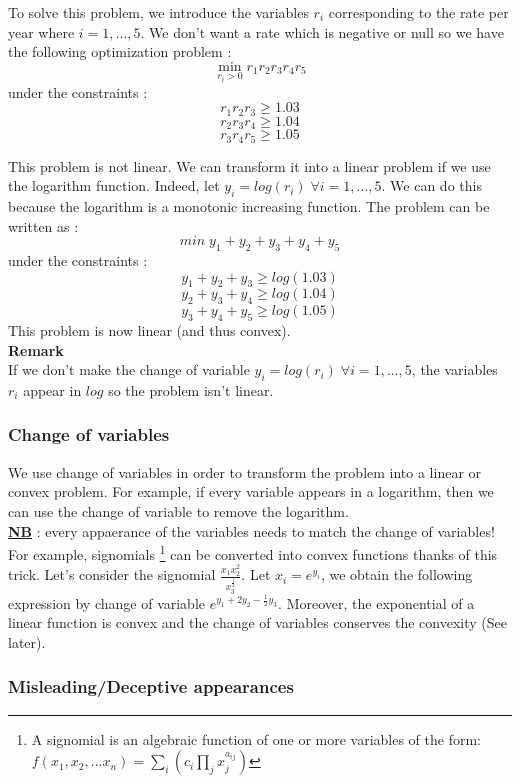 To solve this problem, we introduce the variables $r_i$ corresponding to the rate per year where $i = 1,...,5$. We don't want a rate which is negative or null so we have the following optimization problem :
$$\min \limits _{r_i > 0} r_1r_2r_3r_4r_5 $$
under the constraints : 
$$ r_1r_2r_3 \geq 1.03$$
$$ r_2r_3r_4 \geq 1.04$$
$$ r_3r_4r_5 \geq 1.05$$

This problem is not linear. We can transform it into a linear problem if we use the logarithm function. Indeed, let $y_i = log(r_i) \; \forall i=1,...,5$. We can do this because the logarithm is a monotonic increasing function. The problem can be written as : 
$$ min \; y_1 + y_2 + y_3 + y_4 + y_5$$
under the constraints : 
$$ y_1 + y_2 + y_3 \geq log(1.03)$$
$$ y_2 + y_3 + y_4 \geq log(1.04)$$
$$ y_3 + y_4 + y_5 \geq log(1.05)$$
This problem is now linear (and thus convex). \\

\textbf{Remark}\\
If we don't make the change of variable $y_i = log(r_i) \; \forall i=1,...,5$,  the variables $r_i$ appear in $log$ so the problem isn't linear.

\subsubsection{Change of variables}

We use change of variables in order to transform the problem into a linear or convex problem. For example, if every variable appears in a logarithm, then we can use the change of variable to remove the logarithm.\\ \underline{\textbf{NB}} : every appaerance of the variables needs to match the change of variables! \\

For example, signomials \footnote{A signomial is an algebraic function of one or more variables of the form:\\ $f(x_1,x_2,...x_n) = \sum_i{(c_i\prod_j{x_j^{a_{ij}}})}$} can be converted into convex functions thanks of this trick. Let's consider the signomial $\frac{x_1x_2^2}{x_3^{\frac{1}{2}}}$. Let $x_i = e^{y_i}$, we obtain the following expression by change of variable $e^{y_1+2y_2-\frac{1}{2}y_3}$. Moreover, the exponential of a linear function is convex and the change of variables conserves the convexity (See later).

\subsubsection{Misleading/Deceptive appearances}


